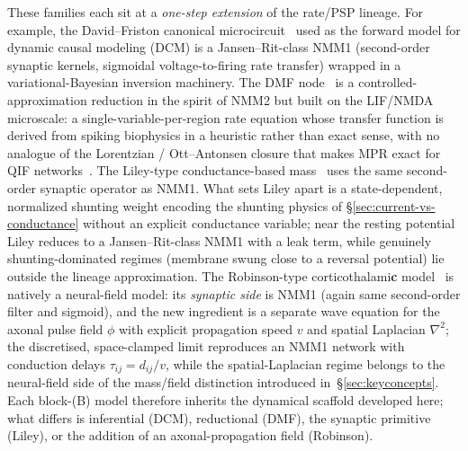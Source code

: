 \documentclass[12pt]{article}
\numberwithin{equation}{section}
\newcommand{\rev}[1]{\begingroup\color{navyblue}#1\endgroup}
\begin{document}
\rev{These families each sit at a \emph{one-step extension} of the rate/PSP lineage. For example, the David--Friston canonical microcircuit~\cite{DavidFriston2003} used as the forward model for dynamic causal modeling (DCM) is a Jansen--Rit-class NMM1 (second-order synaptic kernels, sigmoidal voltage-to-firing rate transfer) wrapped in a variational-Bayesian inversion machinery. The DMF node~\cite{WongWang2006,Deco2013} is a controlled-approximation reduction in the spirit of NMM2 but built on the LIF/NMDA microscale: a single-variable-per-region rate equation whose transfer function is derived from spiking biophysics in a heuristic rather than exact sense, with no analogue of the Lorentzian / Ott--Antonsen closure that makes MPR exact for QIF networks~\cite{montbrioMacroscopicDescriptionNetworks2015,luke2013complete}. The Liley-type conductance-based mass~\cite{LileyCaduschWright1999,LileyCaduschDafilis2002} uses the  same second-order synaptic operator as NMM1. What sets Liley apart is a state-dependent, normalized shunting weight encoding the shunting physics of \S\ref{sec:current-vs-conductance} without an explicit conductance variable; near the resting potential Liley reduces to a Jansen--Rit-class NMM1 with a leak term, while genuinely shunting-dominated regimes (membrane swung close to a reversal potential) lie outside the lineage approximation. The Robinson-type corticothalami\textbf{c} model~\cite{Robinson2001,Rennie2002} is natively a neural-field model: its \emph{synaptic side} is NMM1 (again same second-order filter and sigmoid), and the new ingredient is a separate wave equation for the axonal pulse field $\phi$ with explicit propagation speed $v$ and spatial Laplacian $\nabla^2$; the discretised, space-clamped limit reproduces an NMM1 network with conduction delays $\tau_{ij}=d_{ij}/v$, while the spatial-Laplacian regime belongs to the neural-field side of the mass/field distinction introduced in~\S\ref{sec:keyconcepts}. 
Each block-(B) model therefore inherits the dynamical scaffold developed here; what differs is inferential (DCM), reductional (DMF), the synaptic primitive (Liley), or the addition of an axonal-propagation field (Robinson). }





\end{document}

